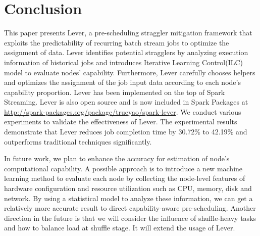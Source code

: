 \section{Conclusion}

  This paper presents Lever, a pre-scheduling straggler mitigation framework that exploits the predictability of recurring batch stream jobs to optimize the assignment of data. Lever identifies potential stragglers by analyzing execution information of historical jobs and introduces Iterative Learning Control(ILC) model to evaluate nodes' capability. Furthermore, Lever carefully chooses helpers and optimizes the assignment of the job input data according to each node's capability proportion. Lever has been implemented on the top of Spark Streaming. Lever is also open source and is now included in Spark Packages at \url{http://spark-packages.org/package/trueyao/spark-lever}. We conduct various experiments to validate the effectiveness of Lever. The experimental results demonstrate that Lever reduces job completion time by 30.72\% to 42.19\% and outperforms traditional techniques significantly.

  In future work, we plan to enhance the accuracy for estimation of node's computational capability. A possible approach is to introduce a new machine learning method to evaluate each node by collecting the node-level features of hardware configuration and resource utilization such as CPU, memory, disk and network. By using a statistical model to analyze these information, we can get a relatively more accurate result to direct capability-aware pre-scheduling. Another direction in the future is that we will consider the influence of shuffle-heavy tasks and how to balance load at shuffle stage. It will extend the usage of Lever.

